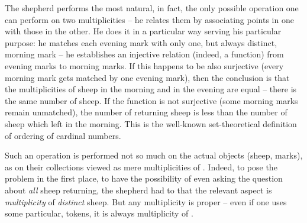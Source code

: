 The shepherd performs the most natural, in fact, the only possible operation one
can perform on two  multiplicities -- he relates them by associating
points in one with those in the other.  He does it in a particular way serving
his particular purpose: he matches each evening mark with only one, but always
distinct, morning mark -- he establishes an injective relation (indeed, a
function) from evening marks to morning marks.  If this happens to be also
surjective (every morning mark gets matched by one evening mark), then the
conclusion is that the multiplicities of sheep in the morning and in the evening
are equal -- there is the same number of sheep.  If the function is not
surjective (some morning marks remain unmatched), the number of returning sheep
is less than the number of sheep which left in the morning.  This is the
well-known set-theoretical definition of ordering of cardinal numbers.

Such an operation is performed not so much on the actual objects (sheep, marks),
as on their collections viewed as mere multiplicities of .
Indeed, to pose the problem in the first place, to have the possibility of even
asking the question about {\em all} sheep returning, the shepherd had to
 that the relevant aspect is 
{\em multiplicity} of {\em distinct} sheep.  But any multiplicity is proper --
even if one uses some particular,  tokens, it is always
multiplicity of .

